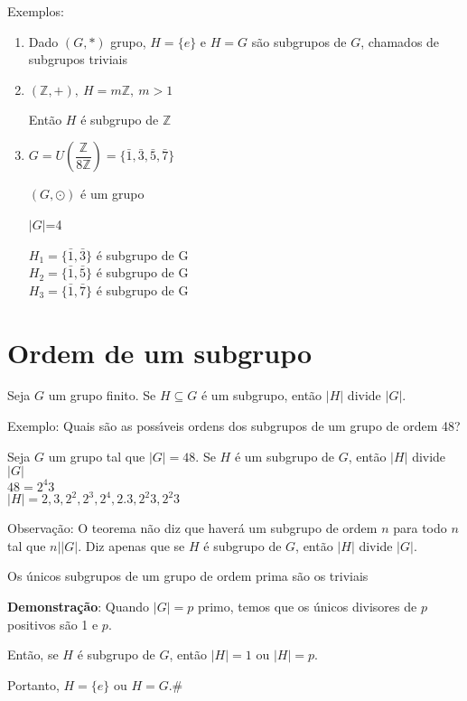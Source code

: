 Exemplos:
\begin{enumerate}
\item Dado $(G,*)$ grupo, $H=\{e\}$ e $H=G$ s{\~a}o subgrupos de $G$, chamados de subgrupos triviais
\item $(\mathbb{Z},+),\ H=m\mathbb{Z},\ m>1$

Ent{\~a}o $H$ {\'e} subgrupo de $\mathbb{Z}$
\item $G=U\left(\dfrac{\mathbb{Z}}{8\mathbb{Z}}\right)=\{\bar{1},\bar{3},\bar{5},\bar{7}\}$

$(G,\odot)$ {\'e} um grupo

$|G|$=4

$H_{1}=\{\bar{1},\bar{3}\}$ {\'e} subgrupo de G\\
$H_{2}=\{\bar{1},\bar{5}\}$ {\'e} subgrupo de G\\
$H_{3}=\{\bar{1},\bar{7}\}$ {\'e} subgrupo de G
\end{enumerate}

\section{Ordem de um subgrupo}

\begin{teorema}[Lagrange]
Seja $G$ um grupo finito. Se $H\subseteq G$ {\'e} um subgrupo, ent{\~a}o $|H|$ divide $|G|$.
\end{teorema}

Exemplo: Quais s{\~a}o as poss{\'\i}veis ordens dos subgrupos de um grupo de ordem 48?

Seja $G$ um grupo tal que $|G|=48$. Se $H$ {\'e} um subgrupo de $G$, ent{\~a}o $|H|$ divide $|G|$\\
$48=2^{4}3$ \\
$|H|=2,3,2^{2},2^{3},2^{4},2.3,2^{2}3,2^{2}3$

Observa{\c c}{\~a}o: O teorema n{\~a}o diz que haver{\'a} um subgrupo de ordem $n$ para todo $n$ tal que $n||G|$. Diz apenas que se $H$ {\'e} subgrupo de $G$, ent{\~a}o $|H|$ divide $|G|$.

\begin{corolario}
Os {\'u}nicos subgrupos de um grupo de ordem prima s{\~a}o os triviais
\end{corolario}

\textbf{Demonstra{\c c}{\~a}o}: Quando $|G|=p$ primo, temos que os {\'u}nicos divisores de $p$ positivos s{\~a}o 1 e $p$.

Ent{\~a}o, se $H$ {\'e} subgrupo de $G$, ent{\~a}o $|H|=1$ ou $|H|=p$.

Portanto, $H=\{e\}$ ou $H=G$.\#